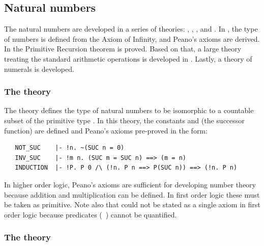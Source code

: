 \subsection{Natural numbers}

The natural numbers are developed in a series of theories:
, , , and
. In , the type of numbers is
defined from the Axiom of Infinity, and Peano's axioms are derived. In
 the Primitive Recursion theorem is proved. Based
on that, a large theory treating the standard arithmetic operations is
developed in . Lastly, a theory of numerals is
developed.

\subsubsection{The theory }

The theory 
defines the type  of natural numbers to be
isomorphic to a countable subset of the primitive type .  In this
theory, the constants 
and  (the successor function) are defined
and Peano's axioms
pre-proved in the form:

\begin{hol}
\begin{verbatim}
   NOT_SUC    |- !n. ~(SUC n = 0)
   INV_SUC    |- !m n. (SUC m = SUC n) ==> (m = n)
   INDUCTION  |- !P. P 0 /\ (!n. P n ==> P(SUC n)) ==> (!n. P n)
\end{verbatim}
\end{hol}

In higher order logic, Peano's axioms are sufficient for developing
number theory because addition and multiplication can be defined. In
first order logic these must be taken as primitive.  Note also that
 could not be stated as a single axiom in first order
logic because predicates (\eg\ ) cannot be quantified.

\subsubsection{The theory }
\label{prim_rec}

